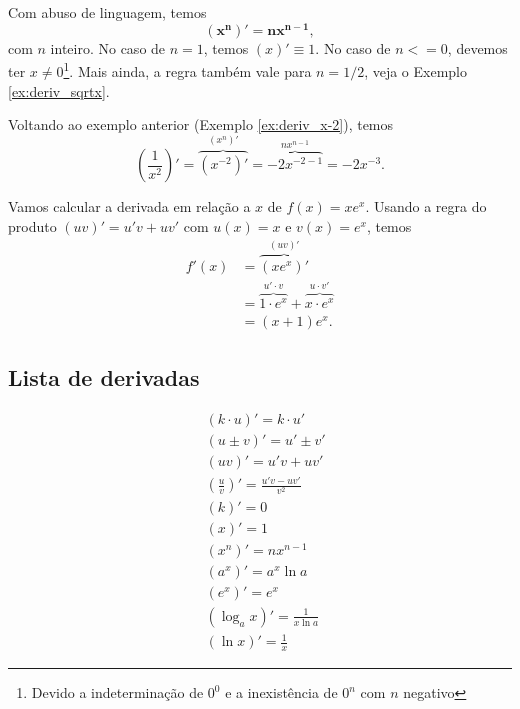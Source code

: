 \begin{obs}
  Com abuso de linguagem, temos
  \begin{equation}
    \pmb{(x^n)' = nx^{n-1}},
  \end{equation}
  com $n$ inteiro. No caso de $n=1$, temos $(x)' \equiv 1$. No caso de $n <= 0$, devemos ter $x\neq 0$\footnote{Devido a indeterminação de $0^0$ e a inexistência de $0^n$ com $n$ negativo}. Mais ainda, a regra também vale para $n=1/2$, veja o Exemplo \ref{ex:deriv_sqrtx}. 
\end{obs}

\begin{ex}
  Voltando ao exemplo anterior (Exemplo \ref{ex:deriv_x-2}), temos
  \begin{equation}
    \left(\frac{1}{x^2}\right)' = \overbrace{(x^{-2})'}^{(x^n)'} = \overbrace{-2x^{-2-1}}^{nx^{n-1}} = -2x^{-3}.
  \end{equation}
\end{ex}

\begin{ex}
  Vamos calcular a derivada em relação a $x$ de $f(x) = xe^x$. Usando a regra do produto $(uv)' = u'v + uv'$ com $u(x) = x$ e $v(x) = e^x$, temos
  \begin{align}
    f'(x) &= \overbrace{(xe^x)'}^{(uv)'}\\
          &= \overbrace{1\cdot e^x}^{u'\cdot v} + \overbrace{x\cdot e^x}^{u\cdot v'}\\
          &= (x + 1)e^x.
  \end{align}
\end{ex}

\subsection{Lista de derivadas}

\begin{align}
  & (k\cdot u)' = k\cdot u'\\
  & (u\pm v)' = u' \pm v'\\
  & (uv)' = u'v + uv'\\
  & \left(\frac{u}{v}\right)' = \frac{u'v - uv'}{v^2}\\
  & (k)' = 0\\
  & (x)' = 1\\
  & (x^n)' = nx^{n-1}\\
  & (a^x)' = a^x\ln a\\
  & (e^x)' = e^x\\
  & (\log_a x)' = \frac{1}{x\ln a}\\
  & (\ln x)' = \frac{1}{x}
\end{align}


